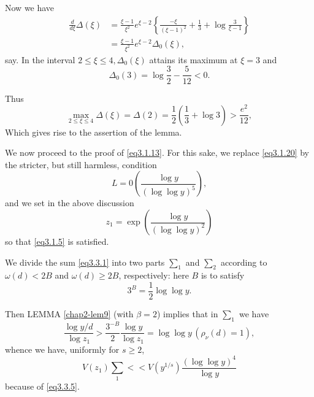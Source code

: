 Now we have
\begin{align*}
  \frac{d}{d \xi} \Delta (\xi) &= \frac{\xi -1}{\xi^2}e^{\xi-2}\left\{
  \frac{-\xi}{(\xi -1)^2}+\frac{1}{3}+\log \frac{3}{\xi -1}\right\}\\ 
  &= \frac{\xi -1}{\xi^2}e^{\xi -2}\Delta_0(\xi),
\end{align*}
say. In the interval $2 \le \xi \le 4, \Delta_0(\xi)$ attains its
maximum at $\xi =3$ and  
$$
\Delta_0(3)=\log \frac{3}{2}-\frac{5}{12}<0.
$$

Thus
$$
\max_{2 \le \xi \le 4} \Delta(\xi)= \Delta(2)=
\frac{1}{2}\left(\frac{1}{3}+\log 3\right)> \frac{e^2}{12}, 
$$
Which gives rise to the assertion of the lemma.

We now proceed to the proof of \eqref{eq3.1.13}. For this sake, we replace
\eqref{eq3.1.20} by the stricter, but still harmless, condition 
\begin{equation*}
  L=0\left(\frac{\log y}{(\log \log y)^5}\right),
  \tag{3.3.4}\label{eq3.3.4} 
\end{equation*}
and we set in the above discussion
\begin{equation*}
  z_1=\exp\left(\frac{\log y}{(\log \log y)^2}\right)
  \tag{3.3.5}\label{eq3.3.5} 
\end{equation*}\pageoriginale
so that \eqref{eq3.1.5} is satisfied.

We divide the sum \eqref{eq3.3.1} into two parts $\sum_1$ and $\sum_2$
according to $\omega(d) < 2B$ and $\omega(d) \ge 2 B$, respectively:
here $B$ is to satisfy 
\begin{equation*}
  3^B = \frac{1}{2} \log \log y. \tag{3.3.6}\label{eq3.3.6}
\end{equation*}

Then LEMMA \ref{chap2-lem9} (with $\beta=2$) implies that in $\sum_1$ we have 
$$
\frac{\log y/d}{\log z_1} > \frac{3^{-B}}{2}\frac{\log y}{\log z_1}=
\log \log  y\, (\rho_\nu (d)=1), 
$$ 
whence we have, uniformly for $s \ge 2$,
\begin{equation*}
V(z_1)\sum_1 << V(y^{1/s})\frac{(\log \log y)^4}{\log y}
\tag{3.3.7}\label{eq3.3.7} 
\end{equation*}
because of \eqref{eq3.3.5}.

